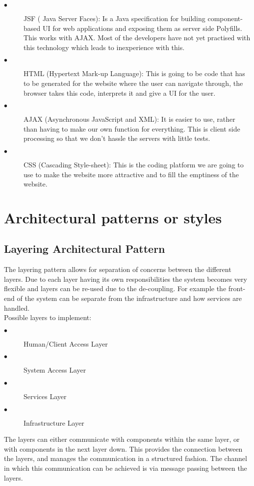 \documentclass[hidelinks, 12pt]{article}
\begin{document}
\begin{description}
  \item[$\bullet$] JSF ( Java Server Faces):
  Is a Java specification for building component-based UI for web applications and exposing them as server side Polyfills. This works with AJAX. Most of the developers have not yet practised with this technology which leads to inexperience with this. 
  
  \item[$\bullet$] HTML (Hypertext Mark-up Language):
  This is going to be code that has to be generated for the website where the user can navigate through, the browser takes this code, interprets it and give a UI for the user. 
  
  \item[$\bullet$] AJAX (Asynchronous JavaScript and XML):
  It is easier to use, rather than having to make our own function for everything. This is client side processing so that we don’t hassle the servers with little tests.
  
  \item[$\bullet$] CSS (Cascading Style-sheet):
  This is the coding platform we are going to use to make the website more attractive and to fill the emptiness of the website.
\end{description}

\section{Architectural patterns or styles}
\subsection{Layering Architectural Pattern}
The layering pattern allows for separation of concerns between the different layers. Due to each layer having its own responsibilities the system becomes very flexible and layers can be re-used due to the de-coupling. For example the front-end of the system can be separate from the infrastructure and how services are handled.\\
Possible layers to implement: 
\begin{description}
\item[$\bullet$]Human/Client Access Layer
\item[$\bullet$]System Access Layer
\item[$\bullet$]Services Layer
\item[$\bullet$]Infrastructure Layer
\end{description}
The layers can either communicate with components within the same layer, or with components in the next layer down. This provides the connection between the layers, and manages the communication
in a structured fashion. The channel in which this communication can be achieved is via message passing between the layers.
\end{document}
